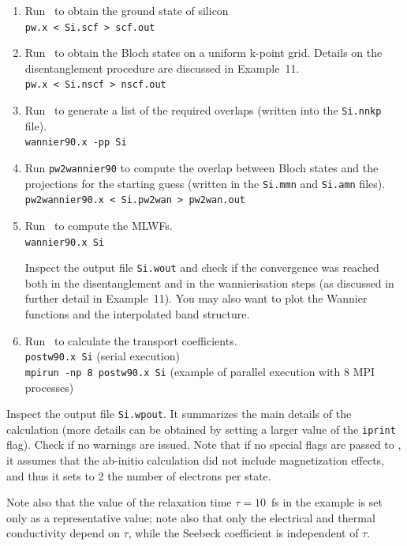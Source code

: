 \documentclass[a4paper,11pt,twoside]{article}
\begin{document}
\begin{enumerate}
\item Run \pwscf\ to obtain the ground state of silicon\\
{\tt pw.x < Si.scf > scf.out}

\item Run \pwscf\ to obtain the Bloch states on a uniform k-point
  grid. Details on the disentanglement procedure are discussed in Example~11.\\ 
{\tt pw.x < Si.nscf > nscf.out}

\item Run \wannier\ to generate a list of the required overlaps (written
  into the {\tt Si.nnkp} file).\\
{\tt wannier90.x -pp Si}

\item Run {\tt pw2wannier90} to compute the overlap between Bloch
  states and the projections for the starting guess (written in the
  {\tt Si.mmn} and {\tt  Si.amn} files).\\
{\tt pw2wannier90.x < Si.pw2wan > pw2wan.out}

\item Run \wannier\ to compute the MLWFs.\\
{\tt wannier90.x Si}

Inspect the output file {\tt Si.wout} and check if the convergence was reached both in the
disentanglement and in the wannierisation steps (as discussed in further detail in Example~11).
You may also want to plot the Wannier functions and the interpolated band structure.

\item Run \postw\ to calculate the transport coefficients.\\
{\tt postw90.x Si} (serial execution) \\
{\tt mpirun -np 8 postw90.x Si} (example of parallel execution with 8
MPI processes) 
\end{enumerate}

Inspect the output file {\tt Si.wpout}. It summarizes the main details of the calculation (more details can be obtained by setting a larger value of the \verb#iprint# flag). 
Check if no warnings are issued. Note that if no special flags are passed to \bw, it assumes that
the ab-initio calculation did not include magnetization effects, and thus it sets to 2 the
number of electrons per state.

Note also that the value of the relaxation time $\tau=10$~fs in the
example is set only as a representative
value; note also that only the electrical and thermal conductivity
depend on $\tau$, while the Seebeck coefficient is independent of
$\tau$.
\end{document}
